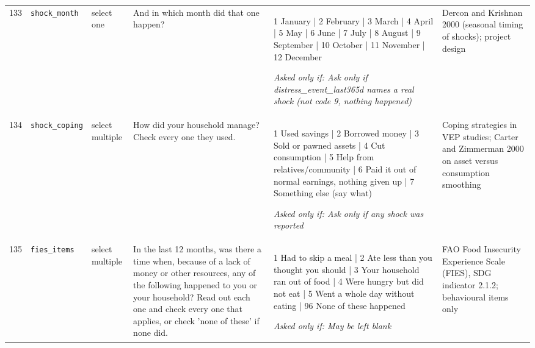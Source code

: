 \documentclass[9pt,a4paper,landscape]{article}
\begin{document}
\begin{longtable}{@{}p{0.5cm}p{3.3cm}p{1.7cm}p{7.3cm}p{5.6cm}p{5.4cm}@{}}
\footnotesize 133 & \footnotesize\texttt{shock\_month} & \scriptsize select one & \footnotesize And in which month did that one happen?\par\vspace{1pt}{\footnotesize\color{hdr}{\hifont और वह किस महीने हुआ था?}} & \scriptsize 1 January | 2 February | 3 March | 4 April | 5 May | 6 June | 7 July | 8 August | 9 September | 10 October | 11 November | 12 December\par\vspace{1pt}\textit{Asked only if: Ask only if distress\_event\_last365d names a real shock (not code 9, nothing happened)} & \scriptsize Dercon and Krishnan 2000 (seasonal timing of shocks); project design\\
\footnotesize 134 & \footnotesize\texttt{shock\_coping} & \scriptsize select multiple & \footnotesize How did your household manage? Check every one they used.\par\vspace{1pt}{\footnotesize\color{hdr}{\hifont आपके घर ने कैसे सँभाला? उन्होंने जो-जो किया, सब चुनिए।}} & \scriptsize 1 Used savings | 2 Borrowed money | 3 Sold or pawned assets | 4 Cut consumption | 5 Help from relatives/community | 6 Paid it out of normal earnings, nothing given up | 7 Something else (say what)\par\vspace{1pt}\textit{Asked only if: Ask only if any shock was reported} & \scriptsize Coping strategies in VEP studies; Carter and Zimmerman 2000 on asset versus consumption smoothing\\
\footnotesize 135 & \footnotesize\texttt{fies\_items} & \scriptsize select multiple & \footnotesize In the last 12 months, was there a time when, because of a lack of money or other resources, any of the following happened to you or your household? Read out each one and check every one that applies, or check 'none of these' if none did.\par\vspace{1pt}{\footnotesize\color{hdr}{\hifont पिछले 12 महीनों में, पैसे या साधन की कमी के कारण, क्या आपके साथ या आपके घर में इनमें से कुछ हुआ? हर एक पढ़कर पूछें और जो लागू हो वो चुनें, या कुछ नहीं हुआ तो वो चुनें।}} & \scriptsize 1 Had to skip a meal | 2 Ate less than you thought you should | 3 Your household ran out of food | 4 Were hungry but did not eat | 5 Went a whole day without eating | 96 None of these happened\par\vspace{1pt}\textit{Asked only if: May be left blank} & \scriptsize FAO Food Insecurity Experience Scale (FIES), SDG indicator 2.1.2; behavioural items only\\
\bottomrule\end{longtable}\vspace{6pt}
\end{document}
